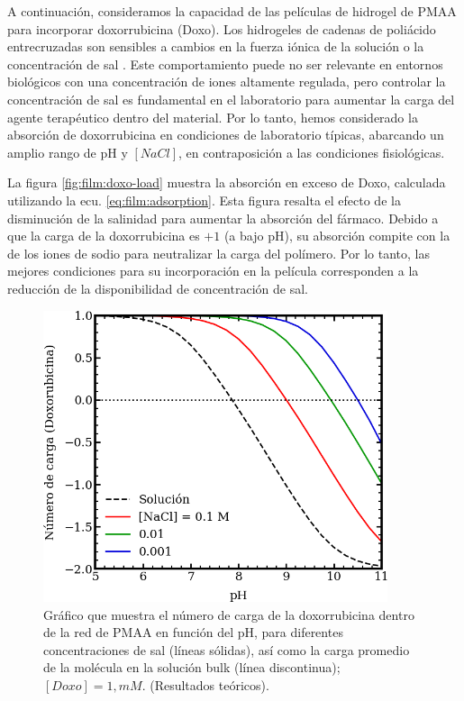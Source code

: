 A continuaci\'on, consideramos la capacidad de las pel\'iculas de hidrogel de PMAA para incorporar doxorrubicina (Doxo). Los hidrogeles de cadenas de poli\'acido entrecruzadas son sensibles a cambios en la fuerza i\'onica de la soluci\'on o la concentraci\'on de sal \cite{zhang2000}. Este comportamiento puede no ser relevante en entornos biol\'ogicos con una concentraci\'on de iones altamente regulada, pero controlar la concentraci\'on de sal es fundamental en el laboratorio para aumentar la carga del agente terap\'eutico dentro del material. Por lo tanto, hemos considerado la absorci\'on de doxorrubicina en condiciones de laboratorio t\'ipicas, abarcando un amplio rango de pH y $[NaCl]$, en contraposici\'on a las condiciones fisiol\'ogicas.

La figura  \ref{fig:film:doxo-load} muestra la absorci\'on en exceso de Doxo, calculada utilizando la ecu. \ref{eq:film:adsorption}. Esta figura resalta el efecto de la disminuci\'on de la salinidad para aumentar la absorci\'on del f\'armaco. Debido a que la carga de la doxorrubicina es $+1$ (a bajo pH), su absorci\'on compite con la de los iones de sodio para neutralizar la carga del pol\'imero. Por lo tanto, las mejores condiciones para su incorporaci\'on en la pel\'icula corresponden a la reducci\'on de la disponibilidad de concentraci\'on de sal.


\begin{figure}[!htb]
	\centering
	\includegraphics[width=0.9\textwidth]{Figures/graph-film/doxo-charge.png}
	\caption{Gr\'afico que muestra el n\'umero de carga de la doxorrubicina dentro de la red de PMAA en funci\'on del pH, para diferentes concentraciones de sal (l\'ineas s\'olidas), as\'i como la carga promedio de la mol\'ecula en la soluci\'on bulk (l\'inea discontinua); $[Doxo]=1, mM$. (Resultados te\'oricos).}
	\label{fig:film:doxo-charge}
\end{figure}

